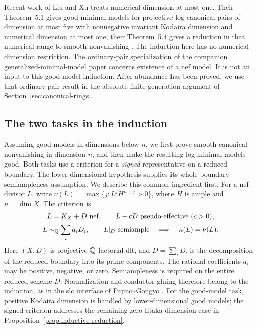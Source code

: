 \begingroup{}
Recent work of Liu and Xu treats numerical dimension at most one.
Their Theorem~5.1 gives good minimal models for projective log canonical
pairs of dimension at most five with nonnegative invariant Kodaira
dimension and numerical dimension at most one; their Theorem~5.4 gives
a reduction in that numerical range to smooth nonvanishing
\cite{LiuXu2025}. The induction here has no numerical-dimension restriction.
The ordinary-pair specialization of the companion generalized-minimal-model
paper \cite[Corollary~1.2]{OpenAIMinimalModels2026} concerns existence of a
nef model. It is not an input to this good-model induction. After abundance
has been proved, we use that ordinary-pair result in the absolute
finite-generation argument of Section~\ref{sec:canonical-rings}.
\par\endgroup

\subsection*{The two tasks in the induction}
Assuming good models in dimensions below $n$, we first prove smooth
canonical nonvanishing in dimension $n$, and then make the resulting
log minimal models good. Both tasks use a criterion for a \emph{signed}
representative on a reduced boundary. The lower-dimensional hypothesis
supplies its whole-boundary semiampleness assumption.
We describe this common ingredient first.
For a nef divisor $L$, write $\nu(L)=\max\{j:L^jH^{n-j}>0\}$,
where $H$ is ample and $n=\dim X$.
The criterion is
\[
 \begin{gathered}
 L=K_X+D\text{ nef},\qquad L-cD\text{ pseudo-effective }(c>0),\\
 L\sim_{\mathbb{Q}}\sum_i a_iD_i,\qquad L|_D\text{ semiample}
 \quad\Longrightarrow\quad\kappa(L)=\nu(L).
 \end{gathered}
\]
Here $(X,D)$ is projective $\mathbb{Q}$-factorial dlt, and
$D=\sum_iD_i$ is the decomposition of the reduced boundary into its prime
components. The rational coefficients $a_i$ may be positive, negative, or
zero. Semiampleness is required on the entire
reduced scheme $D$. Normalization and conductor gluing therefore belong to
the induction, as in the slc interface of Fujino--Gongyo
\cite[Theorem~1.5]{FujinoGongyo2014}.
For the good-model task, positive Kodaira dimension is handled by
lower-dimensional good models; the signed criterion addresses the
remaining zero-Iitaka-dimension case in
Proposition~\ref{prop:inductive-reduction}.


